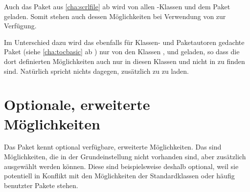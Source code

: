 Auch das Paket \hyperref[cha:scrlfile]{}%
aus \autoref{cha:scrlfile} ab  wird von allen
\KOMAScript-Klassen und dem Paket  geladen.  Somit stehen
auch dessen Möglichkeiten bei Verwendung von  zur
Verfügung.

\iftrue %
Im Unterschied dazu wird das ebenfalls für Klassen- und Paketautoren gedachte
Paket \hyperref[cha:tocbasic]{}%
 (siehe
\autoref{cha:tocbasic} ab ) nur von den Klassen
,  und  geladen, so dass die
dort definierten Möglichkeiten auch nur in diesen Klassen und nicht in
 zu finden sind. Natürlich spricht nichts dagegen,
\hyperref[cha:tocbasic]{} zusätzlich zu
 zu laden.%
\fi




\section{Optionale, erweiterte Möglichkeiten}

Das Paket  kennt optional verfügbare, erweiterte
Möglichkeiten. Das sind Möglichkeiten, die in der Grundeinstellung nicht
vorhanden sind, aber zusätzlich ausgewählt werden können. Diese
sind beispielsweise deshalb optional, weil sie potentiell in Konflikt mit den
Möglichkeiten der Standardklassen oder häufig benutzter Pakete stehen.

